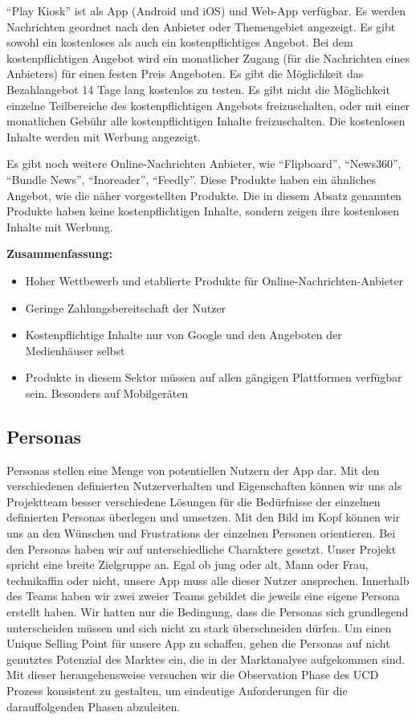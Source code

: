\enquote{Play Kiosk} ist als App (Android und iOS) und Web-App verfügbar. Es werden Nachrichten geordnet nach den Anbieter oder Themengebiet angezeigt. Es gibt sowohl ein kostenloses als auch ein kostenpflichtiges Angebot. Bei dem kostenpflichtigen Angebot wird ein monatlicher Zugang (für die Nachrichten eines Anbieters) für einen festen Preis Angeboten. Es gibt die Möglichkeit das Bezahlangebot 14 Tage lang kostenlos zu testen. Es gibt nicht die Möglichkeit einzelne Teilbereiche des kostenpflichtigen Angebots freizuschalten, oder mit einer monatlichen Gebühr alle kostenpflichtigen Inhalte freizuschalten. Die kostenlosen Inhalte werden mit Werbung angezeigt.

Es gibt noch weitere Online-Nachrichten Anbieter, wie \enquote{Flipboard}, \enquote{News360}, \enquote{Bundle News}, \enquote{Inoreader}, \enquote{Feedly}. Diese Produkte haben ein ähnliches Angebot, wie die näher vorgestellten Produkte. Die in diesem Absatz genannten Produkte haben keine kostenpflichtigen Inhalte, sondern zeigen ihre kostenlosen Inhalte mit Werbung.

\textbf{Zusammenfassung:}

\begin{itemize}
  \item Hoher Wettbewerb und etablierte Produkte für Online-Nachrichten-Anbieter
  \item Geringe Zahlungsbereitschaft der Nutzer
  \item Kostenpflichtige Inhalte nur von Google und den Angeboten der Medienhäuser selbst
  \item Produkte in diesem Sektor müssen auf allen gängigen Plattformen verfügbar sein. Besonders auf Mobilgeräten
\end{itemize}

\subsection{Personas}

Personas stellen eine Menge von potentiellen Nutzern der App dar. Mit den verschiedenen definierten Nutzerverhalten und Eigenschaften können wir uns als Projektteam besser verschiedene Lösungen für die Bedürfnisse der einzelnen definierten Personas überlegen und umsetzen. Mit den Bild im Kopf können wir uns an den Wünschen und Frustrations der einzelnen Personen orientieren. Bei den Personas haben wir auf unterschiedliche Charaktere gesetzt. Unser Projekt spricht eine breite Zielgruppe an. Egal ob jung oder alt, Mann oder Frau, technikaffin oder nicht, unsere App muss alle dieser Nutzer ansprechen. Innerhalb des Teams haben wir zwei zweier Teams gebildet die jeweils eine eigene Persona erstellt haben. Wir hatten nur die Bedingung, dass die Personas sich grundlegend unterscheiden müssen und sich nicht zu stark überschneiden dürfen. Um einen Unique Selling Point für unsere App zu schaffen, gehen die Personas auf nicht genutztes Potenzial des Marktes ein, die in der Marktanalyse aufgekommen sind. Mit dieser herangehensweise versuchen wir die Observation Phase des UCD Prozess konsistent zu gestalten, um eindeutige Anforderungen für die darauffolgenden Phasen abzuleiten.

